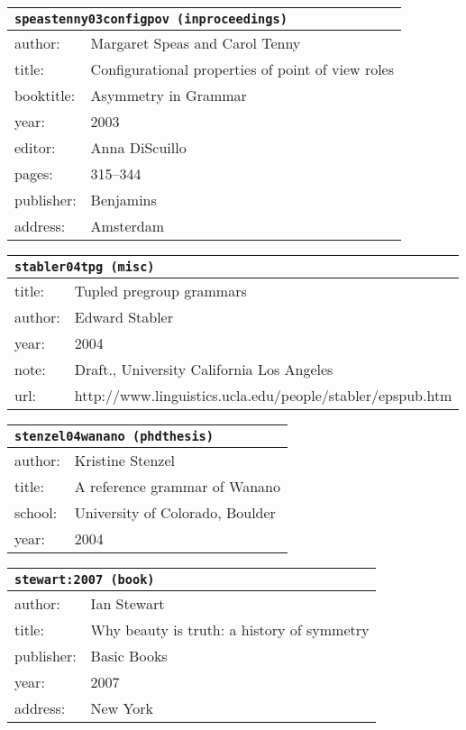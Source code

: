 \documentclass{article}
\begin{document}
\bigskip

\begin{tabular}{p{}p{}}
\multicolumn{2}{l}{\texttt{speastenny03configpov (inproceedings)}}\\
\hline
author: & Margaret Speas and Carol Tenny\\
title: & Configurational properties of point of view roles\\
booktitle: & Asymmetry in Grammar\\
year: & 2003\\
editor: & Anna DiScuillo\\
pages: & 315--344\\
publisher: & Benjamins\\
address: & Amsterdam\\
\end{tabular}

\bigskip

\begin{tabular}{p{}p{}}
\multicolumn{2}{l}{\texttt{stabler04tpg (misc)}}\\
\hline
title: & Tupled pregroup grammars\\
author: & Edward Stabler\\
year: & 2004\\
note: & \textsc{D}raft., University California Los Angeles\\
url: & http://www.linguistics.ucla.edu/people/stabler/epspub.htm\\
\end{tabular}

\bigskip

\begin{tabular}{p{}p{}}
\multicolumn{2}{l}{\texttt{stenzel04wanano (phdthesis)}}\\
\hline
author: & Kristine Stenzel\\
title: & A reference grammar of Wanano\\
school: & University of Colorado, Boulder\\
year: & 2004\\
\end{tabular}

\bigskip

\begin{tabular}{p{}p{}}
\multicolumn{2}{l}{\texttt{stewart:2007 (book)}}\\
\hline
author: & Ian Stewart\\
title: & Why beauty is truth: a history of symmetry\\
publisher: & Basic Books\\
year: & 2007\\
address: & New York\\
\end{tabular}
\end{document}
